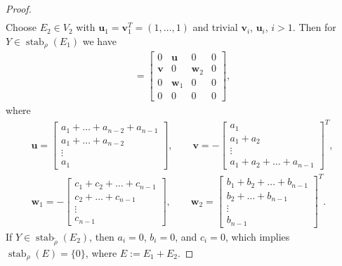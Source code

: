 \documentclass[10pt,a4paper]{amsart}
\numberwithin{equation}{section}
\begin{document}
\begin{proof}
\begin{gather*}
\end{gather*}
Choose $ E_2\in V_2$
with
$\mathbf{u}_1=\mathbf{v}_1^T=(1,\dots,1)$ and trivial $\mathbf{v}_i$, $\mathbf{u}_i$, $i>1$. Then for $Y \in \operatorname{stab}_{\rho}(E_1)$ we have
\begin{gather*} [E_2,Y]=
\left[
\begin{array}{c|c|c|c}
0 & \mathbf{u} & 0 & 0 \\ \hline
\mathbf{v} & 0 & \mathbf{w}_2 & 0 \\ \hline
0 & \mathbf{w}_1 & 0 & 0 \\ \hline
0 & 0 & 0 & 0
\end{array}
\right],\end{gather*}
where
\begin{gather*} \mathbf{u}=\left[\begin{array}{l}
a_{1}+\dots +a_{n-2} +a_{n-1}\\
a_{1}+\dots +a_{n-2}\\
\vdots \\
a_{1}
\end{array}\right]
,\qquad
\mathbf{v}=-\left[\begin{array}{l}
a_{1}\\
a_{1}+a_{2}\\
\vdots \\
a_{1}+a_{2}+\dots +a_{n-1}
\end{array}\right]^T
,\\
\mathbf{w}_1=-\left[\begin{array}{r}
c_{1}+c_{2}+\dots+c_{n-1}\\
c_{2}+\dots+c_{n-1}\\
\vdots\\
c_{n-1}
\end{array}\right], \qquad
\mathbf{w}_2=\left[\begin{array}{r}
b_{1}+b_2+\dots+b_{n-1}\\
b_{2}+\dots+b_{n-1}\\
 \vdots\\
b_{n-1}
\end{array}\right]^T.
\end{gather*}
If $Y\in\operatorname{stab}_{\tilde\rho}(E_2)$, then $a_i=0$, $b_i=0$, and $c_i=0$, which implies $\operatorname{stab}_{\rho}(E) =\{0\} $, where $E:=E_1+E_2$.


\end{proof}
\end{document}
